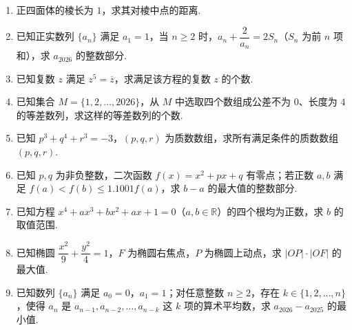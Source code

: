 \documentclass[a4paper,11pt]{report}
\newcommand{\solutionblank}{\par\vspace{7cm}}
\begin{document}
\begin{enumerate}
    \solutionblank

    \item 正四面体的棱长为 $1$，求其对棱中点的距离. 

    \solutionblank

    \item 已知正实数列 $\{a_n\}$ 满足 $a_1=1$，当 $n\geq 2$ 时，$a_n+\dfrac{2}{a_n}=2S_n$（$S_n$ 为前 $n$ 项和），求 $a_{2026}$ 的整数部分. 

    \solutionblank

    \item 已知复数 $z$ 满足 $z^5=\overline{z}$，求满足该方程的复数 $z$ 的个数. 

    \solutionblank

    \item 已知集合 $M=\{1,2,\ldots,2026\}$，从 $M$ 中选取四个数组成公差不为 $0$、长度为 $4$ 的等差数列，求这样的等差数列的个数. 

    \solutionblank

    \item 已知 $p^3+q^4+r^3=-3$，$(p,q,r)$ 为质数数组，求所有满足条件的质数数组 $(p,q,r)$. 

    \solutionblank

    \item 已知 $p,q$ 为非负整数，二次函数 $f(x)=x^2+px+q$ 有零点；若正数 $a,b$ 满足 $f(a)<f(b)\leq 1.1001f(a)$，求 $b-a$ 的最大值的整数部分. 

    \solutionblank

    \item 已知方程 $x^4+ax^3+bx^2+ax+1=0$（$a,b\in\mathbb{R}$）的四个根均为正数，求 $b$ 的取值范围. 

    \solutionblank

    \item 已知椭圆 $\dfrac{x^2}{9}+\dfrac{y^2}{4}=1$，$F$ 为椭圆右焦点，$P$ 为椭圆上动点，求 $|OP|\cdot |OF|$ 的最大值. 

    \solutionblank

    \item 已知数列 $\{a_n\}$ 满足 $a_0=0$，$a_1=1$；对任意整数 $n\geq 2$，存在 $k\in\{1,2,\ldots,n\}$，使得 $a_n$ 是 $a_{n-1},a_{n-2},\ldots,a_{n-k}$ 这 $k$ 项的算术平均数，求 $a_{2026}-a_{2025}$ 的最小值. 

    \solutionblank
\end{enumerate}
\end{document}
